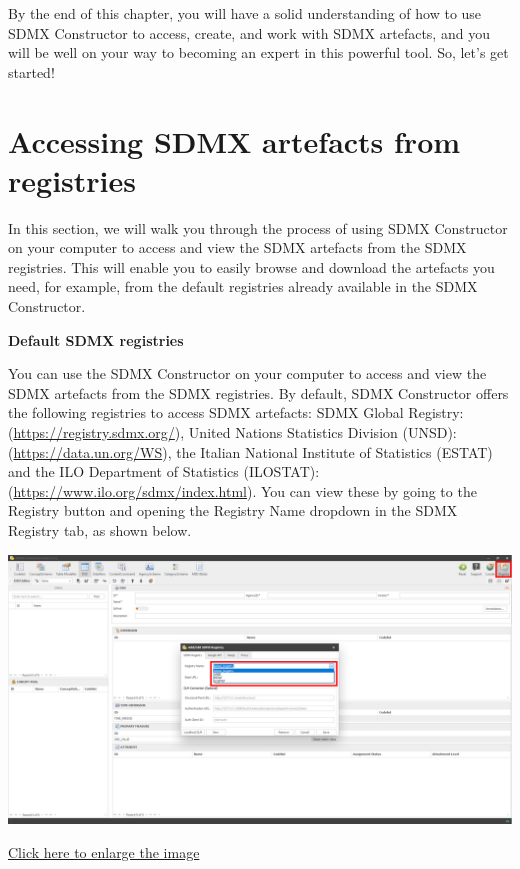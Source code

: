 \documentclass[
]{book}
\begin{document}
By the end of this chapter, you will have a solid understanding of how to use SDMX Constructor to access, create, and work with SDMX artefacts, and you will be well on your way to becoming an expert in this powerful tool. So, let's get started!

\hypertarget{accessing-sdmx}{%
\section{Accessing SDMX artefacts from registries}\label{accessing-sdmx}}

In this section, we will walk you through the process of using SDMX Constructor on your computer to access and view the SDMX artefacts from the SDMX registries. This will enable you to easily browse and download the artefacts you need, for example, from the default registries already available in the SDMX Constructor.

\textbf{Default SDMX registries}

You can use the SDMX Constructor on your computer to access and view the SDMX artefacts from the SDMX registries. By default, SDMX Constructor offers the following registries to access SDMX artefacts: SDMX Global Registry: (\url{https://registry.sdmx.org/}), United Nations Statistics Division (UNSD): (\url{https://data.un.org/WS}), the Italian National Institute of Statistics (ESTAT) and the ILO Department of Statistics (ILOSTAT): (\url{https://www.ilo.org/sdmx/index.html}). You can view these by going to the Registry button and opening the Registry Name dropdown in the SDMX Registry tab, as shown below.

\begin{center}\includegraphics[width=1\linewidth]{./images/image044} \end{center}

\href{images/image044.png}{Click here to enlarge the image}
\end{document}
